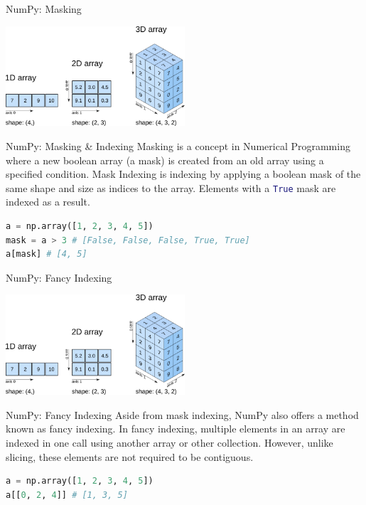 \documentclass{beamer}
\begin{document}
    \begin{frame}[fragile]{NumPy: Masking}
        \begin{center}
            \includegraphics[width=0.5\textwidth]{figures/what-is-numpy-768x429.png}
        \end{center}
    \end{frame}
    \begin{frame}[fragile]{NumPy: Masking \& Indexing}
        Masking is a concept in Numerical Programming where a new boolean array (a mask) is created from an old array using a specified condition.
        \pause
        Mask Indexing is indexing by applying a boolean mask of the same shape and size as indices to the array. Elements with a \lstinline[language=Python]{True} mask are indexed as a result.
        \begin{example}
            \begin{lstlisting}[language=Python]
a = np.array([1, 2, 3, 4, 5])
mask = a > 3 # [False, False, False, True, True]
a[mask] # [4, 5]
            \end{lstlisting}
        \end{example}
    \end{frame}

    \begin{frame}[fragile]{NumPy: Fancy Indexing}
        \begin{center}
            \includegraphics[width=0.5\textwidth]{figures/what-is-numpy-768x429.png}
        \end{center}
    \end{frame}
    \begin{frame}[fragile]{NumPy: Fancy Indexing}
        Aside from mask indexing, NumPy also offers a method known as fancy indexing. In fancy indexing, multiple elements in an array are indexed in one call using another array or other collection. However, unlike slicing, these elements are not required to be contiguous.
        \begin{example}
            \begin{lstlisting}[language=Python]
a = np.array([1, 2, 3, 4, 5])
a[[0, 2, 4]] # [1, 3, 5]
            \end{lstlisting}
        \end{example}
    \end{frame}
\end{document}
